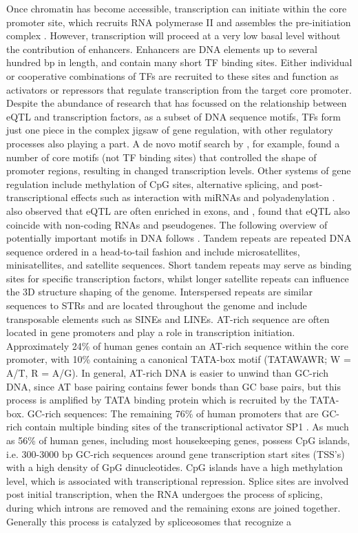 \documentclass[12pt, onecolumn, oneside]{gsajnl}
\begin{document}
Once chromatin has become accessible, transcription can initiate within the core promoter site, which recruits RNA polymerase II and assembles the pre-initiation complex \citep{zabidi2016regulatory}. However, transcription will proceed at a very low basal level without the contribution of enhancers. Enhancers are DNA elements up to several hundred bp in length, and contain many short TF binding sites. Either individual or cooperative combinations of TFs are recruited to these sites and function as activators or repressors that regulate transcription from the target core promoter. Despite the abundance of research that has focussed on the relationship between eQTL and transcription factors, as a subset of DNA sequence motifs, TFs form just one piece in the complex jigsaw of gene regulation, with other regulatory processes also playing a part. A de novo motif search by \citet{schor2017promoter}, for example, found a number of core motifs (not TF binding sites) that controlled
the shape of promoter regions, resulting in changed transcription levels. Other systems of gene regulation include methylation of CpG sites, alternative splicing, and post-transcriptional effects such as interaction with miRNAs and polyadenylation \citep{gaffney2013global}. \citet{gaffney2013global} also observed that eQTL are often enriched in exons, and \citet{kirsten2015dissecting}, found that eQTL also coincide with non-coding RNAs and pseudogenes. 
The following overview of potentially important motifs in DNA follows \citep{boeva2016analysis}. Tandem repeats are repeated DNA sequence ordered in a head-to-tail fashion and include microsatellites, minisatellites, and satellite sequences. Short tandem repeats may serve as binding sites for specific transcription factors, whilst longer satellite repeats can influence the 3D structure shaping of the genome. Interspersed repeats are similar sequences to
STRs and are located throughout the genome and include transposable elements such as SINEs and LINEs. AT-rich sequence are often located in gene promoters and play a role in transcription initiation. Approximately 24\% of human genes contain an AT-rich sequence within the core promoter, with 10\% containing a canonical TATA-box motif (TATAWAWR; W = A/T, R = A/G). In general, AT-rich DNA is easier to unwind than GC-rich DNA, since AT base pairing contains fewer bonds than GC base pairs, but this process is amplified by TATA binding protein which is recruited by the TATA-box. GC-rich sequences: The remaining 76\% of human promoters that are GC-rich contain multiple binding sites of the transcriptional activator SP1 \citep{yang2007prevalence}. As much as 56\% of human genes, including most housekeeping genes, possess CpG islands, i.e. 300-3000 bp GC-rich sequences around gene transcription start sites (TSS's) with a high density of GpG dinucleotides. CpG islands have a high methylation level, which is associated with transcriptional repression. Splice sites are involved post initial transcription, when the RNA undergoes the process of splicing, during which introns are removed and the remaining exons are joined together. Generally this process is catalyzed by spliceosomes that recognize a
\end{document}
